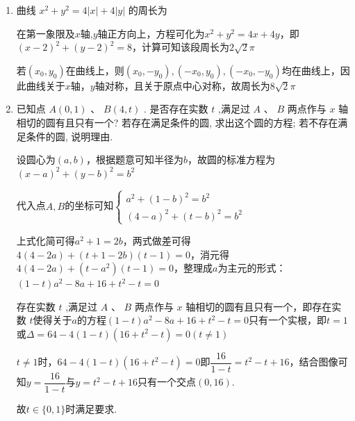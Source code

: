 \begin{enumerate}
\begin{jieda}
\begin{enumerate}
            综上所述：当 $S < 3$ 时, 0 条；当 $S = 3$ 时, 1 条；当 $S > 3$ 时, 2 条.
        \end{enumerate}
    \end{jieda}
    \item 曲线 ${x}^{2} + {y}^{2} = 4\left| x\right|  + 4\left| y\right|$ 的周长为
    \begin{jieda}
        在第一象限及$x$轴,$y$轴正方向上，方程可化为${x}^{2} + {y}^{2} = 4x+4y$，即$(x-2)^2+(y-2)^2 = 8$，计算可知该段周长为$2\sqrt{2}\pi$

        若$(x_0, y_0)$在曲线上，则$(x_0, -y_0), (-x_0, y_0), (-x_0, -y_0)$均在曲线上，因此曲线关于$x$轴，$y$轴对称，且关于原点中心对称，故周长为$8\sqrt{2}\pi$
    \end{jieda}
    \item 已知点 $A\left( {0,1}\right)$ 、 $B\left( {4,t}\right)$ . 是否存在实数 $t$ ,满足过 $A$ 、 $B$ 两点作与 $x$ 轴相切的圆有且只有一个? 若存在满足条件的圆, 求出这个圆的方程; 若不存在满足条件的圆, 说明理由.
    \begin{jieda}
        设圆心为$(a, b)$，根据题意可知半径为$b$，故圆的标准方程为$(x-a)^2+(y-b)^2 = b^2$
        
        代入点$A, B$的坐标可知$\left\{\begin{array}{l}
             a^2+(1-b)^2 = b^2 \\
             (4-a)^2+(t-b)^2 = b^2
        \end{array}\right.$

        上式化简可得$a^2+1=2b$，两式做差可得$4(4-2a)+(t+1-2b)(t-1) = 0$，消元得$4(4-2a)+(t-a^2)(t-1) = 0$，整理成$a$为主元的形式：$(1-t)a^2 - 8a + 16+t^2-t = 0$

        存在实数 $t$ ,满足过 $A$ 、 $B$ 两点作与 $x$ 轴相切的圆有且只有一个，即存在实数 $t$使得关于$a$的方程$(1-t)a^2 - 8a + 16+t^2-t = 0$只有一个实根，即$t = 1$或$\Delta = 64 - 4(1-t)(16+t^2-t) = 0 (t \neq 1)$

        $t \neq 1$时，$64 - 4(1-t)(16+t^2-t) = 0$即$\dfrac{16}{1-t} = t^2-t+16$，结合图像可知$y = \dfrac{16}{1-t}$与$y = t^2-t+16$只有一个交点$(0, 16)$.

        故$t \in \{0, 1\}$时满足要求.

    \end{jieda}


\end{enumerate}
